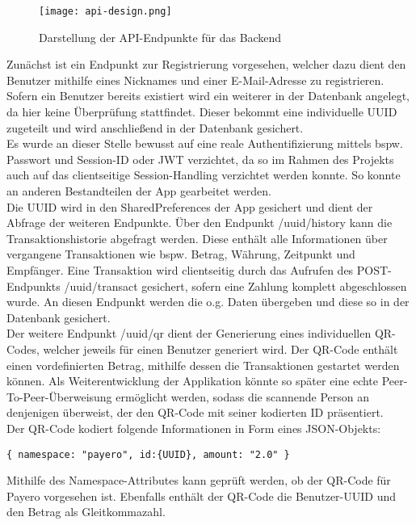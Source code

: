 \begin{figure}[H]
  \centering
  \texttt{[image: api-design.png]}
  \label{fig:apidesign}
  \caption{Darstellung der API-Endpunkte für das Backend}
\end{figure}

Zunächst ist ein Endpunkt zur Registrierung vorgesehen, welcher dazu dient den Benutzer mithilfe eines Nicknames und einer E-Mail-Adresse zu registrieren.
Sofern ein Benutzer bereits existiert wird ein weiterer in der Datenbank angelegt, da hier keine Überprüfung stattfindet.
Dieser bekommt eine individuelle UUID zugeteilt und wird anschließend in der Datenbank gesichert.\\
Es wurde an dieser Stelle bewusst auf eine reale Authentifizierung mittels bspw. Passwort und Session-ID oder JWT verzichtet, da so im Rahmen des Projekts auch auf das clientseitige Session-Handling verzichtet werden konnte.
So konnte an anderen Bestandteilen der App gearbeitet werden.\\
Die UUID wird in den SharedPreferences der App gesichert und dient der Abfrage der weiteren Endpunkte.
Über den Endpunkt /{uuid}/history kann die Transaktionshistorie abgefragt werden.
Diese enthält alle Informationen über vergangene Transaktionen wie bspw. Betrag, Währung, Zeitpunkt und Empfänger.
Eine Transaktion wird clientseitig durch das Aufrufen des POST-Endpunkts /{uuid}/transact gesichert, sofern eine Zahlung komplett abgeschlossen wurde.
An diesen Endpunkt werden die o.g. Daten übergeben und diese so in der Datenbank gesichert.\\
Der weitere Endpunkt /{uuid}/qr dient der Generierung eines individuellen QR-Codes, welcher jeweils für einen Benutzer generiert wird. Der QR-Code enthält einen vordefinierten Betrag, mithilfe dessen die Transaktionen gestartet werden können.
Als Weiterentwicklung der Applikation könnte so später eine echte Peer-To-Peer-Überweisung ermöglicht werden, sodass die scannende Person an denjenigen überweist, der den QR-Code mit seiner kodierten ID präsentiert.\\
Der QR-Code kodiert folgende Informationen in Form eines JSON-Objekts:
\begin{lstlisting}[caption={Vom Backend generierte Notation für den QR-Code}]
  { namespace: "payero", id:{UUID}, amount: "2.0" }
\end{lstlisting}
Mithilfe des Namespace-Attributes kann geprüft werden, ob der QR-Code für Payero vorgesehen ist.
Ebenfalls enthält der QR-Code die Benutzer-UUID und den Betrag als Gleitkommazahl.